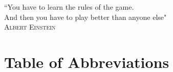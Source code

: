 \documentclass[twoside,11pt,a4paper]{article}
\begin{document}
\vfill
\clearpage
\begin{center}
\vspace*{\fill}
\begin{minipage}{6in}



\centering \Large{``You have to learn the rules of the game.\\ And then you have to play better than anyone else"}\\{\normalsize{\textsc{Albert Einstein}}}

  \end{minipage}
  \vspace*{\fill}
\end{center}


\clearpage
\maketitle
\vspace{-5.5em} %
\begingroup
    \fontsize{9pt}{11pt}\selectfont
\tableofcontents
\endgroup
\clearpage
{}
\section*{Table of Abbreviations}



\clearpage


\listoffigures

\clearpage

\listoftables
{} 
\clearpage
\end{document}
